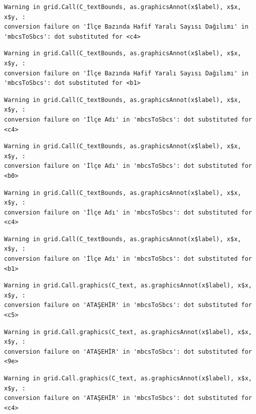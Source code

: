\documentclass[
  11pt,
  a4paper,
  DIV=11,
  numbers=noendperiod]{scrartcl}
\begin{document}
\begin{verbatim}
Warning in grid.Call(C_textBounds, as.graphicsAnnot(x$label), x$x, x$y, :
conversion failure on 'İlçe Bazında Hafif Yaralı Sayısı Dağılımı' in
'mbcsToSbcs': dot substituted for <c4>
\end{verbatim}

\begin{verbatim}
Warning in grid.Call(C_textBounds, as.graphicsAnnot(x$label), x$x, x$y, :
conversion failure on 'İlçe Bazında Hafif Yaralı Sayısı Dağılımı' in
'mbcsToSbcs': dot substituted for <b1>
\end{verbatim}

\begin{verbatim}
Warning in grid.Call(C_textBounds, as.graphicsAnnot(x$label), x$x, x$y, :
conversion failure on 'İlçe Adı' in 'mbcsToSbcs': dot substituted for <c4>
\end{verbatim}

\begin{verbatim}
Warning in grid.Call(C_textBounds, as.graphicsAnnot(x$label), x$x, x$y, :
conversion failure on 'İlçe Adı' in 'mbcsToSbcs': dot substituted for <b0>
\end{verbatim}

\begin{verbatim}
Warning in grid.Call(C_textBounds, as.graphicsAnnot(x$label), x$x, x$y, :
conversion failure on 'İlçe Adı' in 'mbcsToSbcs': dot substituted for <c4>
\end{verbatim}

\begin{verbatim}
Warning in grid.Call(C_textBounds, as.graphicsAnnot(x$label), x$x, x$y, :
conversion failure on 'İlçe Adı' in 'mbcsToSbcs': dot substituted for <b1>
\end{verbatim}

\begin{verbatim}
Warning in grid.Call.graphics(C_text, as.graphicsAnnot(x$label), x$x, x$y, :
conversion failure on 'ATAŞEHİR' in 'mbcsToSbcs': dot substituted for <c5>
\end{verbatim}

\begin{verbatim}
Warning in grid.Call.graphics(C_text, as.graphicsAnnot(x$label), x$x, x$y, :
conversion failure on 'ATAŞEHİR' in 'mbcsToSbcs': dot substituted for <9e>
\end{verbatim}

\begin{verbatim}
Warning in grid.Call.graphics(C_text, as.graphicsAnnot(x$label), x$x, x$y, :
conversion failure on 'ATAŞEHİR' in 'mbcsToSbcs': dot substituted for <c4>
\end{verbatim}
\end{document}
